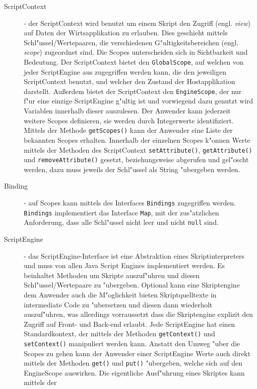 \begin{description}
    \item[ScriptContext] - der ScriptContext wird benutzt um einem Skript den Zugriff (engl. \emph{view}) auf Daten der 
    Wirtsapplikation zu erlauben. Dies geschieht mittels Schl"ussel/Wertepaaren, die verschiedenen G"ultigkeitsbereichen
    (engl. \emph{scope}) zugeordnet sind. Die Scopes unterscheiden sich in Sichtbarkeit und Bedeutung. Der ScriptContext 
    bietet den \texttt{GlobalScope}, auf welchen von jeder ScriptEngine aus zugegriffen werden kann, die den
    jeweiligen ScriptContext benutzt, und welcher den Zustand der Hostapplikation darstellt.
    Au\ss erdem bietet der ScriptContext den \texttt{EngineScope}, der nur f"ur eine einzige ScriptEngine g"ultig ist und 
    vorwiegend dazu genutzt wird Variablen innerhalb dieser auszulesen.
    Der Anwender kann jederzeit weitere Scopes definieren, sie werden durch Integerwerte identifiziert. Mittels der
    Methode \texttt{getScopes()} kann der Anwender eine Liste der bekannten Scopes erhalten. Innerhalb der einzelnen Scopes
    k"onnen Werte mittels der Methoden des ScriptContext \texttt{setAttribute()}, \texttt{getAttribute()} und \texttt{removeAttribute()} 
    gesetzt, beziehungsweise abgerufen und gel"oscht werden, dazu muss jeweils der Schl"ussel als String "ubergeben werden.
    \item[Binding] - auf Scopes kann mittels des Interfaces \texttt{Bindings} zugegriffen werden. \texttt{Bindings} implementiert
    das Interface \texttt{Map}, mit der zus"atzlichen Anforderung, dass alle Schl"ussel nicht leer und nicht \texttt{null} sind.
    \item[ScriptEngine] - das ScriptEngine-Interface ist eine Abstraktion eines Skriptinterpreters und muss von
    allen Java Script Engines implementiert werden. Es beinhaltet Methoden um Skripte auszuf"uhren und diesen
    Schl"ussel/Wertepaare zu "ubergeben. Optional kann eine Skriptengine dem Anwender auch die M"oglichkeit bieten
    Skriptquelltexte in intermediate Code zu "ubersetzen und diesen dann wiederholt auszuf"uhren, was allerdings
    vorraussetzt dass die Skriptengine explizit den Zugriff auf Front- und Back-end erlaubt. Jede ScriptEngine hat einen
    Standardkontext, der mittels der Methoden \texttt{getContext()} und \texttt{setContext()} manipuliert werden kann. Anstatt den
    Umweg "uber die Scopes zu gehen kann der Anwender einer ScriptEngine Werte auch direkt mittels der Methoden \texttt{get()} und 
    \texttt{put()} "ubergeben, welche sich auf den EngineScope auswirken. Die eigentliche Ausf"uhrung eines Skriptes kann mittels der

\end{description}
